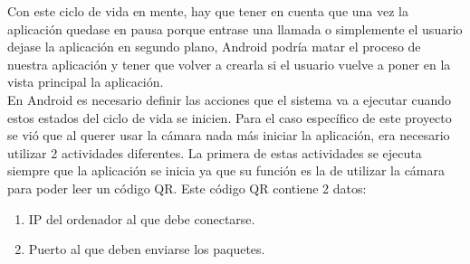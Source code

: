 \begin{figure}[h]

\end{figure}

Con este ciclo de vida en mente, hay que tener en cuenta que una vez la aplicaci\'on quedase en pausa porque entrase una llamada o simplemente el usuario dejase la aplicaci\'on en segundo plano, Android podr\'ia matar el proceso de nuestra aplicaci\'on y tener que volver a crearla si el usuario vuelve a poner en la vista principal la aplicaci\'on.
\\
En Android es necesario definir las acciones que el sistema va a ejecutar cuando estos estados del ciclo de vida se inicien. Para el caso espec\'ifico de este proyecto se vi\'o que al querer usar la c\'amara nada m\'as iniciar la aplicaci\'on, era necesario utilizar 2 actividades diferentes. La primera de estas actividades se ejecuta siempre que la aplicaci\'on se inicia ya que su funci\'on es la de utilizar la c\'amara para poder leer un c\'odigo QR. Este c\'odigo QR contiene 2 datos:

\begin{enumerate}

\item IP del ordenador al que debe conectarse.
\item Puerto al que deben enviarse los paquetes.

\end{enumerate}

